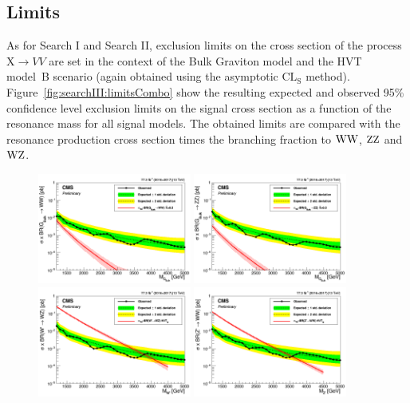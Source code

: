 \subsection{Limits}
As for Search I and Search II, exclusion limits on the cross section of the process $\text{X} \to VV$ are set in the context of the Bulk Graviton model and the HVT model~B scenario (again obtained using the asymptotic $\text{CL}_\text{S}$ method). Figure~\ref{fig:searchIII:limitsCombo} show the resulting expected and observed 95\% confidence level exclusion limits on the signal cross section as a function of the resonance mass for all signal models. The obtained limits are compared with the resonance production cross section times the branching fraction to $\mathrm{W}\mathrm{W}$, $\mathrm{Z}\mathrm{Z}$ and $\mathrm{W}\mathrm{Z}$.
\begin{figure}[h!]
\centering
\includegraphics[width=0.45\textwidth]{figures/analysis/search3/AN-17-303/limits/limits_BulkGWW_combo_2016_2017.png}
\includegraphics[width=0.45\textwidth]{figures/analysis/search3/AN-17-303/limits/limits_BulkGZZ_combo_2016_2017.png}\\
\includegraphics[width=0.45\textwidth]{figures/analysis/search3/AN-17-303/limits/limits_WprimeWZ_combo_2016_2017.png}
\includegraphics[width=0.45\textwidth]{figures/analysis/search3/AN-17-303/limits/limits_ZprimeWW_combo_2016_2017.png}

\end{figure}
